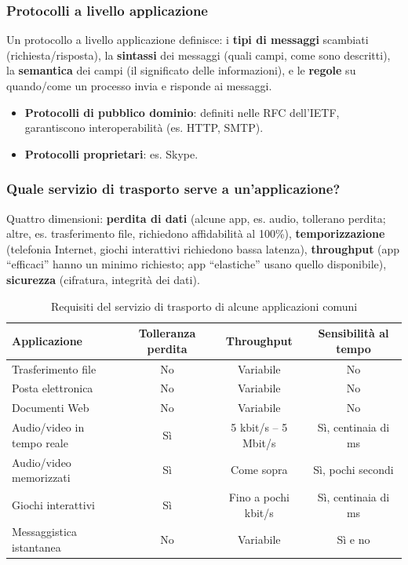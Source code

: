 \documentclass[12pt, a4paper]{article}
\begin{document}
\subsubsection{Protocolli a livello applicazione}

Un protocollo a livello applicazione definisce: i \textbf{tipi di messaggi} scambiati (richiesta/risposta), la \textbf{sintassi} dei messaggi (quali campi, come sono descritti), la \textbf{semantica} dei campi (il significato delle informazioni), e le \textbf{regole} su quando/come un processo invia e risponde ai messaggi.

\begin{itemize}
    \item \textbf{Protocolli di pubblico dominio}: definiti nelle RFC dell'IETF, garantiscono interoperabilità (es. HTTP, SMTP).
    \item \textbf{Protocolli proprietari}: es. Skype.
\end{itemize}

\subsubsection{Quale servizio di trasporto serve a un'applicazione?}

Quattro dimensioni: \textbf{perdita di dati} (alcune app, es. audio, tollerano perdita; altre, es. trasferimento file, richiedono affidabilità al 100\%), \textbf{temporizzazione} (telefonia Internet, giochi interattivi richiedono bassa latenza), \textbf{throughput} (app ``efficaci'' hanno un minimo richiesto; app ``elastiche'' usano quello disponibile), \textbf{sicurezza} (cifratura, integrità dei dati).

\begin{table}[H]
\centering
\caption{Requisiti del servizio di trasporto di alcune applicazioni comuni}
\small
\begin{tabular}{lccc}
\toprule
\textbf{Applicazione} & \textbf{Tolleranza perdita} & \textbf{Throughput} & \textbf{Sensibilità al tempo} \\
\midrule
Trasferimento file & No & Variabile & No \\
Posta elettronica & No & Variabile & No \\
Documenti Web & No & Variabile & No \\
Audio/video in tempo reale & Sì & 5 kbit/s -- 5 Mbit/s & Sì, centinaia di ms \\
Audio/video memorizzati & Sì & Come sopra & Sì, pochi secondi \\
Giochi interattivi & Sì & Fino a pochi kbit/s & Sì, centinaia di ms \\
Messaggistica istantanea & No & Variabile & Sì e no \\
\bottomrule
\end{tabular}
\end{table}
\end{document}
